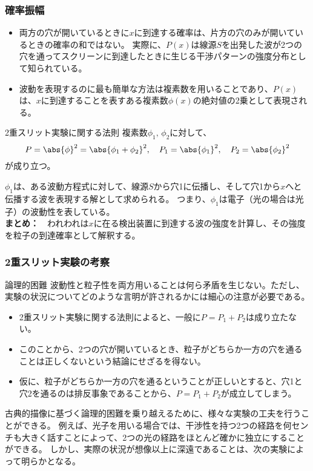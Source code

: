 \documentclass[11pt,aspectratio=169,xcolor=dvipsnames,table,dvipdfmx]{beamer}
\begin{document}
\begin{frame}
  \frametitle{確率振幅}
  \begin{itemize}
    \item   両方の穴が開いているときに$x$に到達する確率は、片方の穴のみが開いているときの確率の和ではない。
    実際に、$P(x)$は線源$S$を出発した波が2つの穴を通ってスクリーンに到達したときに生じる干渉パターンの強度分布として知られている。
    \item 波動を表現するのに最も簡単な方法は複素数を用いることであり、$P(x)$は、$x$に到達することを表すある複素数$\phi(x)$の絶対値の2乗として表現される。
  \end{itemize}
  \begin{block}{2重スリット実験に関する法則}
    複素数$\phi_1,\,\phi_2$に対して、
    \begin{equation}
      P = \abs{\phi}^2 = \abs{\phi_1 + \phi_2}^2 ,\quad P_1 = \abs{\phi_1}^2 ,\quad P_2 = \abs{\phi_2}^2
    \end{equation}
    が成り立つ。
  \end{block}
  $\phi_1$は、ある波動方程式に対して、線源$S$から穴1に伝播し、そして穴1から$x$へと伝播する波を表現する解として求められる。
  つまり、$\phi_1$は電子（光の場合は光子）の波動性を表している。\\
  \textbf{まとめ：　}\color{red}われわれは$x$に在る検出装置に到達する波の強度を計算し、その強度を粒子の到達確率として解釈する。
\end{frame}

\begin{frame}
  \frametitle{2重スリット実験の考察}
  \begin{block}{論理的困難}
    波動性と粒子性を両方用いることは何ら矛盾を生じない。ただし、実験の状況についてどのような言明が許されるかには細心の注意が必要である。
\begin{itemize}
  \item 2重スリット実験に関する法則によると、一般に$P=P_1+P_2$は成り立たない。
  \item このことから、2つの穴が開いているとき、粒子がどちらか一方の穴を通ることは正しくないという結論にせざるを得ない。
  \item 仮に、粒子がどちらか一方の穴を通るということが正しいとすると、穴1と穴2を通るのは排反事象であることから、$P=P_1+P_2$が成立してしまう。
\end{itemize}
  \end{block}
古典的描像に基づく論理的困難を乗り越えるために、様々な実験の工夫を行うことができる。
例えば、光子を用いる場合では、干渉性を持つ2つの経路を何センチも大きく話すことによって、2つの光の経路をほとんど確かに独立にすることができる。
しかし、実際の状況が想像以上に深遠であることは、次の実験によって明らかとなる。
\end{frame}
\end{document}
